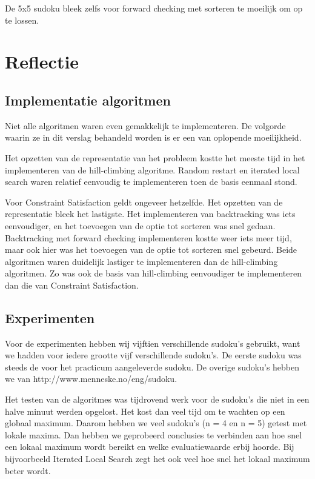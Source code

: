 \documentclass[]{report}
\begin{document}
De 5x5 sudoku bleek zelfs voor forward checking met sorteren te moeilijk om op te lossen.

\chapter{Reflectie}
\section{Implementatie algoritmen}
Niet alle algoritmen waren even gemakkelijk te implementeren. De volgorde waarin ze in dit verslag behandeld worden is er een van oplopende moeilijkheid. 

Het opzetten van de representatie van het probleem kostte het meeste tijd in het implementeren van de hill-climbing algoritme. Random restart en iterated local search waren relatief eenvoudig te implementeren toen de basis eenmaal stond.

Voor Constraint Satisfaction geldt ongeveer hetzelfde. Het opzetten van de representatie bleek het lastigste. Het implementeren van backtracking was iets eenvoudiger, en het toevoegen van de optie tot sorteren was snel gedaan. Backtracking met forward checking implementeren kostte weer iets meer tijd, maar ook hier was het toevoegen van de optie tot sorteren snel gebeurd. Beide algoritmen waren duidelijk lastiger te implementeren dan de hill-climbing algoritmen. Zo was ook de basis van hill-climbing eenvoudiger te implementeren dan die van Constraint Satisfaction.

\section{Experimenten}
Voor de experimenten hebben wij vijftien verschillende sudoku's gebruikt, want we hadden voor iedere grootte vijf verschillende sudoku's. De eerste sudoku was steeds de voor het practicum aangeleverde sudoku. De overige sudoku's hebben we van http://www.menneske.no/eng/sudoku. 

Het testen van de algoritmes was tijdrovend werk voor de sudoku's die niet in een halve minuut werden opgelost. Het kost dan veel tijd om te wachten op een globaal maximum. Daarom hebben we veel sudoku's (n = 4 en n = 5) getest met lokale maxima. Dan hebben we geprobeerd conclusies te verbinden aan hoe snel een lokaal maximum wordt bereikt en welke evaluatiewaarde erbij hoorde. Bij bijvoorbeeld Iterated Local Search zegt het ook veel hoe snel het lokaal maximum beter wordt. 
\end{document}
